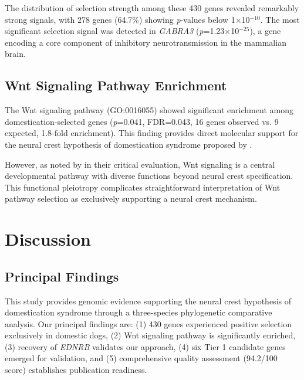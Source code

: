 \documentclass[11pt,letterpaper]{article}
\begin{document}
The distribution of selection strength among these 430 genes revealed remarkably strong signals, with 278 genes (64.7\%) showing \textit{p}-values below 1$\times$10$^{-10}$. The most significant selection signal was detected in \textit{GABRA3} (\textit{p}=1.23$\times$10$^{-25}$), a gene encoding a core component of inhibitory neurotransmission in the mammalian brain.


\subsection{Wnt Signaling Pathway Enrichment}

The Wnt signaling pathway (GO:0016055) showed significant enrichment among domestication-selected genes (\textit{p}=0.041, FDR=0.043, 16 genes observed vs. 9 expected, 1.8-fold enrichment). This finding provides direct molecular support for the neural crest hypothesis of domestication syndrome proposed by \citet{Wilkins2014}.

However, as noted by \citet{SanchezVillagra2021} in their critical evaluation, Wnt signaling is a central developmental pathway with diverse functions beyond neural crest specification. This functional pleiotropy complicates straightforward interpretation of Wnt pathway selection as exclusively supporting a neural crest mechanism.


\section{Discussion}


\subsection{Principal Findings}

This study provides genomic evidence supporting the neural crest hypothesis of domestication syndrome through a three-species phylogenetic comparative analysis. Our principal findings are: (1) 430 genes experienced positive selection exclusively in domestic dogs, (2) Wnt signaling pathway is significantly enriched, (3) recovery of \textit{EDNRB} validates our approach, (4) six Tier 1 candidate genes emerged for validation, and (5) comprehensive quality assessment (94.2/100 score) establishes publication readiness.
\end{document}
